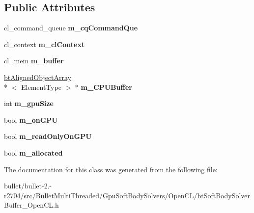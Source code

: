 \subsection*{Public Attributes}
\begin{DoxyCompactItemize}
\item 
\hypertarget{classbt_open_c_l_buffer_a50902e133ee04c129c737d88e3f04c34}{cl\+\_\+command\+\_\+queue {\bfseries m\+\_\+cq\+Command\+Que}}\label{classbt_open_c_l_buffer_a50902e133ee04c129c737d88e3f04c34}

\item 
\hypertarget{classbt_open_c_l_buffer_a39873214f4129017d2c175241f7786e7}{cl\+\_\+context {\bfseries m\+\_\+cl\+Context}}\label{classbt_open_c_l_buffer_a39873214f4129017d2c175241f7786e7}

\item 
\hypertarget{classbt_open_c_l_buffer_a5de1367b9257357561c7e82376d741e5}{cl\+\_\+mem {\bfseries m\+\_\+buffer}}\label{classbt_open_c_l_buffer_a5de1367b9257357561c7e82376d741e5}

\item 
\hypertarget{classbt_open_c_l_buffer_ac738025381e142778a6d9b00fd9c74c8}{\hyperlink{classbt_aligned_object_array}{bt\+Aligned\+Object\+Array}\\*
$<$ Element\+Type $>$ $\ast$ {\bfseries m\+\_\+\+C\+P\+U\+Buffer}}\label{classbt_open_c_l_buffer_ac738025381e142778a6d9b00fd9c74c8}

\item 
\hypertarget{classbt_open_c_l_buffer_a46043d658e27e6ab76e7adb4011fc0f2}{int {\bfseries m\+\_\+gpu\+Size}}\label{classbt_open_c_l_buffer_a46043d658e27e6ab76e7adb4011fc0f2}

\item 
\hypertarget{classbt_open_c_l_buffer_abf0b3c59fbbf54fdb5650bb15ff90289}{bool {\bfseries m\+\_\+on\+G\+P\+U}}\label{classbt_open_c_l_buffer_abf0b3c59fbbf54fdb5650bb15ff90289}

\item 
\hypertarget{classbt_open_c_l_buffer_aed34ffe5f6ebffee05b4ac7a0a64b892}{bool {\bfseries m\+\_\+read\+Only\+On\+G\+P\+U}}\label{classbt_open_c_l_buffer_aed34ffe5f6ebffee05b4ac7a0a64b892}

\item 
\hypertarget{classbt_open_c_l_buffer_abbe8e30713416b5b62a30b37dbb9cf68}{bool {\bfseries m\+\_\+allocated}}\label{classbt_open_c_l_buffer_abbe8e30713416b5b62a30b37dbb9cf68}

\end{DoxyCompactItemize}


The documentation for this class was generated from the following file\+:\begin{DoxyCompactItemize}
\item 
bullet/bullet-\/2.-\/r2704/src/\+Bullet\+Multi\+Threaded/\+Gpu\+Soft\+Body\+Solvers/\+Open\+C\+L/bt\+Soft\+Body\+Solver\+Buffer\+\_\+\+Open\+C\+L.\+h\end{DoxyCompactItemize}
